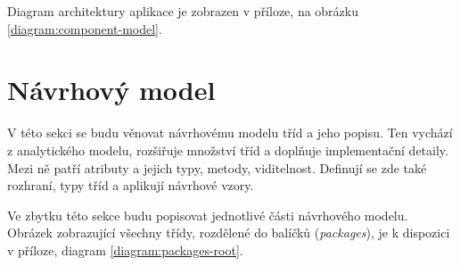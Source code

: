 \documentclass[thesis=B,czech]{FITthesis}[2012/06/26]
\begin{document}
		Diagram architektury aplikace je zobrazen v příloze, na obrázku \ref{diagram:component-model}. 
		
	
	
	
	
	
	\section{Návrhový model}
		V této sekci se budu věnovat návrhovému modelu tříd a jeho popisu. Ten vychází z analytického modelu, rozšiřuje množství tříd a doplňuje implementační detaily. Mezi ně patří atributy a jejich typy, metody, viditelnost. Definují se zde také rozhraní, typy tříd a aplikují návrhové vzory. \cite{navrhovy-model}
		
		Ve zbytku této sekce budu popisovat jednotlivé části návrhového modelu. Obrázek zobrazující všechny třídy, rozdělené do balíčků (\textit{packages}), je k dispozici v příloze, diagram \ref{diagram:packages-root}.
		
\end{document}
